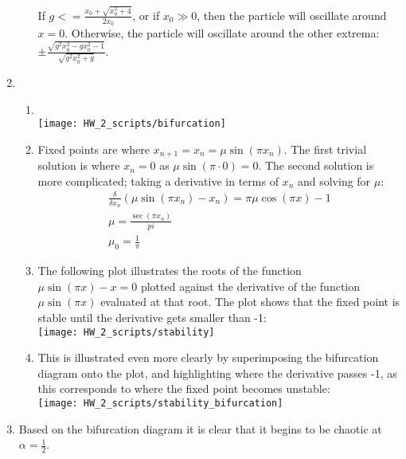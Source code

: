 \documentclass[12pt]{article}
\begin{document}
\begin{enumerate}
\begin{enumerate}
            If $g<=\frac{x_0+\sqrt{x_0^2+4}}{2x_0}$, or if $x_0\gg 0$, then the particle will oscillate around $x=0$.
            Otherwise, the particle will oscillate around the other extrema: $\pm\frac{\sqrt{g^2 x_0^2-gx_0^2-1}}{\sqrt{g^2 x_0^2+g}}$.
        \end{enumerate}
        \item\\
        \begin{enumerate}
            \item\\
            
            \texttt{[image: HW\_2\_scripts/bifurcation]}
            \item
            Fixed points are where $x_{n+1}=x_n=\mu\sin\left(\pi x_n\right)$.
            The first trivial solution is where $x_n=0$ as $\mu\sin\left(\pi\cdot0\right)=0$.
            The second solution is more complicated;
            taking a derivative in terms of $x_n$ and solving for $\mu$:
            \begin{gather*}
                \frac{\delta}{\delta x_n}\left(\mu\sin\left(\pi x_n\right)-x_n\right)=\pi\mu\cos(\pi x)-1\\
                \mu=\frac{\sec(\pi x_n)}{pi}\\
                \mu_0=\frac{1}{\pi}
            \end{gather*}
            \item
            The following plot illustrates the roots of the function $\mu\sin(\pi x)-x=0$ plotted against the derivative of the function $\mu\sin(\pi x)$ evaluated at that root.
            The plot shows that the fixed point is stable until the derivative gets smaller than -1:\\
            \texttt{[image: HW\_2\_scripts/stability]}
            \item This is illustrated even more clearly by superimposing the bifurcation diagram onto the plot, and highlighting where the derivative passes -1, as this corresponds to where the fixed point becomes unstable:\\
            \texttt{[image: HW\_2\_scripts/stability\_bifurcation]}
            
        \end{enumerate}
        \item
        Based on the bifurcation diagram it is clear that it begins to be chaotic at $\alpha=\frac{1}{2}$.

\end{enumerate}
\end{document}
